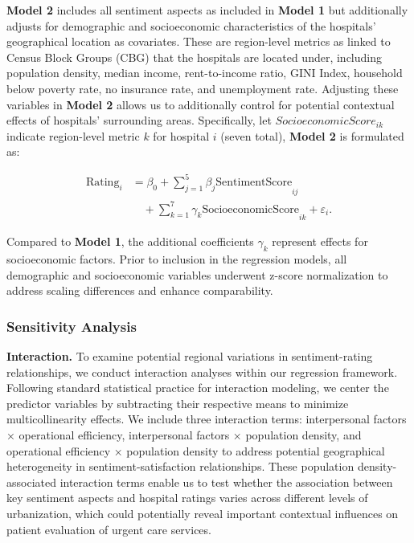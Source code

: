 \documentclass[journal,twoside,web]{ieeecolor}
\begin{document}
\textbf{Model 2} includes all sentiment aspects as included in \textbf{Model 1} but additionally adjusts for demographic and socioeconomic characteristics of the hospitals' geographical location as covariates. These are region-level metrics as linked to Census Block Groups (CBG) that the hospitals are located under, including population density, median income, rent-to-income ratio, GINI Index, household below poverty rate, no insurance rate, and unemployment rate. Adjusting these variables in \textbf{Model 2} allows us to additionally control for potential
contextual effects of hospitals' surrounding areas. Specifically, let ${SocioeconomicScore}_{ik}$ indicate region-level metric $k$ for hospital $i$ (seven total), \textbf{Model 2} is formulated as:

\begin{align*}
{\text{Rating}}_{i} &= \beta_{0} + \sum_{j = 1}^{5}{{\beta_{j}\text{SentimentScore}}_{ij}} \\
&\quad + \sum_{k = 1}^{7}{{\gamma_{k}\text{SocioeconomicScore}}_{ik} + \varepsilon_{i}}.
\end{align*}

Compared to \textbf{Model 1}, the additional coefficients $\gamma_{k}$ represent effects for socioeconomic factors. Prior to inclusion in the regression models, all demographic and socioeconomic variables underwent z-score normalization to address scaling differences and enhance comparability.

\subsubsection{Sensitivity Analysis}

\textbf{Interaction.} To examine potential regional variations in sentiment-rating relationships, we conduct interaction analyses within our regression framework. Following standard statistical practice for interaction modeling, we center the predictor variables by subtracting their respective means to minimize multicollinearity effects. We include three interaction terms: interpersonal factors × operational efficiency, interpersonal factors × population density, and operational efficiency × population density to address potential geographical heterogeneity in sentiment-satisfaction relationships. These population density-associated interaction terms enable us to test whether the association between key sentiment aspects and hospital ratings varies across different levels of urbanization, which could potentially reveal important contextual influences on patient evaluation of urgent care services.
\end{document}
